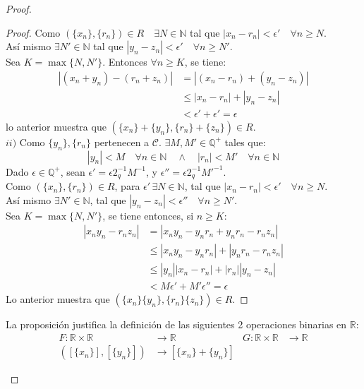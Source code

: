 \begin{proof}
\begin{proof}
  Como $(\{x_n\},\{r_n\})\in R \quad \exists N \in \mathbb{N}$ tal que
  $|x_n-r_n|< \epsilon' \quad \forall n \geq N$. \\
  Así mismo $\exists N' \in \mathbb{N}$ tal que
  $|y_n-z_n|< \epsilon' \quad \forall n \geq N'$. \\
  Sea $K = \max \{N,N'\}$. Entonces $\forall n \geq K$, se tiene:
  \begin{align*}
    |(x_n +y_n)-(r_n +z_n)| &= |(x_n-r_n) + (y_n-z_n)| \\
                            &\leq |x_n-r_n|+|y_n-z_n| \\
                            &< \epsilon' + \epsilon' = \epsilon
  \end{align*}
  lo anterior muestra que $(\{x_n\} + \{y_n\}, \{r_n\} + \{z_n\})\in R$.\\
  $ii)$ Como $\{y_n\},\{r_n\}$ pertenecen a $\mathcal{C}$. $\exists M, M' \in
  \mathbb{Q}^+$ tales que:
  \[
    |y_n|<M \quad \forall n \in \mathbb{N} \quad \land \quad |r_n| < M'
    \quad \forall n \in \mathbb{N}
  \]
  Dado $\epsilon \in \mathbb{Q}^+$, sean $\epsilon' = \epsilon2_q^{-1}M^{-1}$,
  y $\epsilon'' = \epsilon2_q^{-1}M'^{-1}$. \\
  Como $(\{x_n\},\{r_n\})\in R$, para $\epsilon' \, \exists N \in \mathbb{N}$,
  tal que $|x_n-r_n|<\epsilon' \quad \forall n \geq N$.\\
  Así mismo $\exists N' \in \mathbb{N}$,
  tal que $|y_n-z_n|<\epsilon'' \quad \forall n \geq N'$.\\
  Sea $K =\max \{N,N'\}$, se tiene entonces, si $n\geq K$:
  \begin{align*}
    |x_ny_n-r_nz_n| &= |x_ny_n -y_nr_n + y_nr_n -r_nz_n| \\
                    &\leq |x_ny_n-y_nr_n| + |y_nr_n-r_nz_n| \\
                    &\leq |y_n||x_n-r_n| + |r_n||y_n-z_n| \\
                    &<M\epsilon' + M'\epsilon'' = \epsilon
  \end{align*}
  Lo anterior muestra que $ (\{x_n\} \{y_n\}, \{r_n\} \{z_n\})\in R $.
\end{proof}
\begin{definition}
  La proposición justifica la definición de las siguientes 2 operaciones
  binarias en $\mathbb{R}$:
  \begin{align*}
    F: \mathbb{R}\times \mathbb{R} &\to \mathbb{R} &
    G: \mathbb{R}\times \mathbb{R} &\to \mathbb{R} \\
    ([\{x_n\}],[\{y_n\}]) &\to [\{x_n\}+\{y_n\}] &

\end{align*}
\end{definition}
\end{proof}
